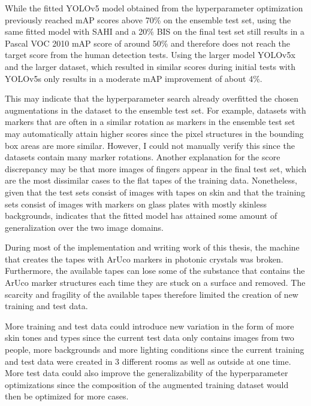 \documentclass[10pt]{book}
\begin{document}
While the fitted \ac{YOLO}v5 model obtained from the hyperparameter optimization previously reached \ac{mAP} scores above 70\% on the ensemble test set, using the same fitted model with \ac{SAHI} and a 20\% \ac{BIS} on the final test set still results in a Pascal VOC 2010 \ac{mAP} score of around 50\% and therefore does not reach the target score from the human detection tests. Using the larger model \ac{YOLO}v5x and the larger dataset, which resulted in similar scores during initial tests with \ac{YOLO}v5s only results in a moderate \ac{mAP} improvement of about 4\%.

This may indicate that the hyperparameter search already overfitted the chosen augmentations in the dataset to the ensemble test set. For example, datasets with markers that are often in a similar rotation as markers in the ensemble test set may automatically attain higher scores since the pixel structures in the bounding box areas are more similar. However, I could not manually verify this since the datasets contain many marker rotations. Another explanation for the score discrepancy may be that more images of fingers appear in the final test set, which are the most dissimilar cases to the flat tapes of the training data. %
Nonetheless, given that the test sets consist of images with tapes on skin and that the training sets consist of images with markers on glass plates with mostly skinless backgrounds, indicates that the fitted model has attained some amount of generalization over the two image domains.

During most of the implementation and writing work of this thesis, the machine that creates the tapes with \ac{ArUco} markers in photonic crystals was broken. Furthermore, the available tapes can lose some of the substance that contains the \ac{ArUco} marker structures each time they are stuck on a surface and removed. The scarcity and fragility of the available tapes therefore limited the creation of new training and test data. 

More training and test data could introduce new variation in the form of more skin tones and types since the current test data only contains images from two people, more backgrounds and more lighting conditions since the current training and test data were created in 3 different rooms as well as outside at one time. More test data could also improve the generalizability of the hyperparameter optimizations since the composition of the augmented training dataset would then be optimized for more cases.
\end{document}
